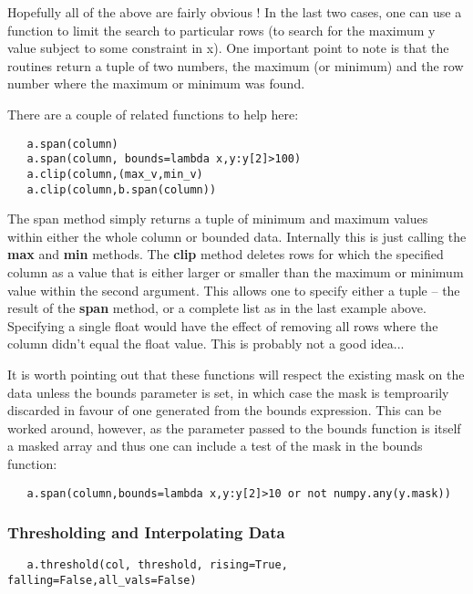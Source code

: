 \documentclass[a4paper,11pt]{scrartcl}
\begin{document}
Hopefully all of the above are fairly obvious ! In the last two cases, one can use a function to limit the search to particular rows (\eg to search for the maximum y value subject to some constraint in x). One important point to note is that the routines return a tuple of two numbers, the maximum (or minimum) and the row number where the maximum or minimum was found.

There are a couple of related functions to help here:

\begin{lstlisting}
   a.span(column)
   a.span(column, bounds=lambda x,y:y[2]>100)
   a.clip(column,(max_v,min_v)
   a.clip(column,b.span(column))
\end{lstlisting}

The span method simply returns a tuple of minimum and maximum values within either the whole column or bounded data. Internally this is just calling the \textbf{max} and \textbf{min} methods. The \textbf{clip} method deletes rows for which the specified column as a value that is either larger or smaller than the maximum or minimum value within the second argument. This allows one to specify either a tuple -- \eg the result of the \textbf{span} method, or a complete list as in the last example above. Specifying a single float would have the effect of removing all rows where the column didn't equal the float value. This is probably not a good idea...

It is worth pointing out that these functions will respect the existing mask on the data unless the bounds parameter is set, in which case the mask is temproarily discarded in favour of one generated from the bounds expression. This can be worked around, however, as the parameter passed to the bounds function is itself a masked array and thus one can include a test of the mask in the bounds function:

\begin{lstlisting}
   a.span(column,bounds=lambda x,y:y[2]>10 or not numpy.any(y.mask))
\end{lstlisting}

\subsubsection{Thresholding and Interpolating Data}
\begin{lstlisting}
   a.threshold(col, threshold, rising=True, falling=False,all_vals=False)
\end{lstlisting}
\end{document}

